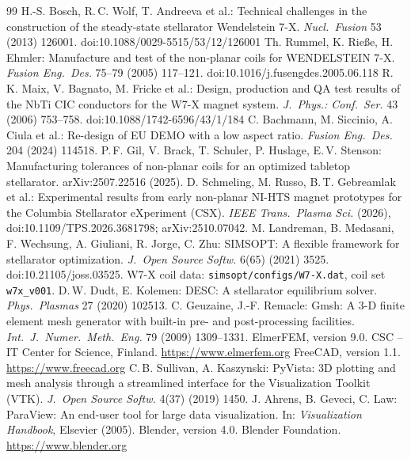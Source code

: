 \documentclass[10pt,a4paper]{article}
\begin{document}
\begin{thebibliography}{99}\small
{} H.-S. Bosch, R.\,C. Wolf, T. Andreeva et al.: Technical challenges in the construction of
  the steady-state stellarator Wendelstein 7-X. \emph{Nucl.\ Fusion} 53 (2013) 126001.
  doi:10.1088/0029-5515/53/12/126001
 Th. Rummel, K. Rieße, H. Ehmler: Manufacture and test of the non-planar coils for
  WENDELSTEIN 7-X. \emph{Fusion Eng.\ Des.} 75--79 (2005) 117--121. doi:10.1016/j.fusengdes.2005.06.118
 R.\,K. Maix, V. Bagnato, M. Fricke et al.: Design, production and QA test results of the
  NbTi CIC conductors for the W7-X magnet system. \emph{J.\ Phys.: Conf.\ Ser.} 43 (2006) 753--758.
  doi:10.1088/1742-6596/43/1/184
 C. Bachmann, M. Siccinio, A. Ciula et al.: Re-design of EU DEMO with a low aspect ratio.
  \emph{Fusion Eng.\ Des.} 204 (2024) 114518.
 P.\,F. Gil, V. Brack, T. Schuler, P. Huslage, E.\,V. Stenson: Manufacturing tolerances of
  non-planar coils for an optimized tabletop stellarator. arXiv:2507.22516 (2025).
 D. Schmeling, M. Russo, B.\,T. Gebreamlak et al.: Experimental results from early
  non-planar NI-HTS magnet prototypes for the Columbia Stellarator eXperiment (CSX). \emph{IEEE Trans.\ Plasma
  Sci.} (2026), doi:10.1109/TPS.2026.3681798; arXiv:2510.07042.
 M. Landreman, B. Medasani, F. Wechsung, A. Giuliani, R. Jorge, C. Zhu: SIMSOPT: A flexible
  framework for stellarator optimization. \emph{J.\ Open Source Softw.} 6(65) (2021) 3525.
  doi:10.21105/joss.03525. W7-X coil data: \texttt{simsopt/configs/W7-X.dat}, coil set \texttt{w7x\_v001}.
 D.\,W. Dudt, E. Kolemen: DESC: A stellarator equilibrium solver. \emph{Phys.\ Plasmas} 27 (2020)
  102513.
 C. Geuzaine, J.-F. Remacle: Gmsh: A 3-D finite element mesh generator with built-in pre- and
  post-processing facilities. \emph{Int.\ J.\ Numer.\ Meth.\ Eng.} 79 (2009) 1309--1331.
 ElmerFEM, version 9.0. CSC -- IT Center for Science, Finland. \url{https://www.elmerfem.org}
 FreeCAD, version 1.1. \url{https://www.freecad.org}
 C.\,B. Sullivan, A. Kaszynski: PyVista: 3D plotting and mesh analysis through a streamlined
  interface for the Visualization Toolkit (VTK). \emph{J.\ Open Source Softw.} 4(37) (2019) 1450.
 J. Ahrens, B. Geveci, C. Law: ParaView: An end-user tool for large data visualization. In:
  \emph{Visualization Handbook}, Elsevier (2005).
 Blender, version 4.0. Blender Foundation. \url{https://www.blender.org}

\end{thebibliography}
\end{document}
